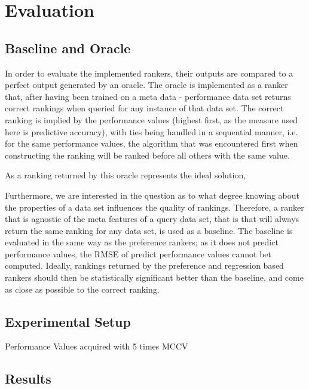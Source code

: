 %
\chapter{Evaluation}
\label{sec:evaluation}

\section{Baseline and Oracle}
In order to evaluate the implemented rankers, their outputs are compared to a perfect output generated by an oracle. The oracle is implemented as a ranker that, after having been trained on a meta data - performance data set returns correct rankings when queried for any instance of that data set. The correct ranking is implied by the performance values (highest first, as the measure used here is predictive accuracy), with ties being handled in a sequential manner, i.e. for the same performance values, the algorithm that was encountered first when constructing the ranking will be ranked before all others with the same value.

As a ranking returned by this oracle represents the ideal solution, 

Furthermore, we are interested in the question as to what degree knowing about the properties of a data set influences the quality of rankings. Therefore, a ranker that is agnostic of the meta features of a query data set, that is that will always return the same ranking for any data set, is used as a baseline. The baseline is evaluated in the same way as the preference rankers; as it does not predict performance values, the RMSE of predict performance values cannot bet computed. Ideally, rankings returned by the preference and regression based rankers should then be statistically significant better than the baseline, and come as close as possible to the correct ranking.

\section{Experimental Setup}


Performance Values acquired with 5 times MCCV


\section{Results}

